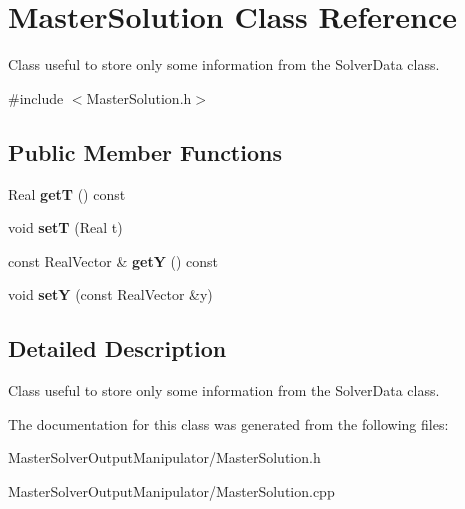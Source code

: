 \hypertarget{classMasterSolution}{
\section{MasterSolution Class Reference}
\label{classMasterSolution}
}


Class useful to store only some information from the SolverData class.  


{\ttfamily \#include $<$MasterSolution.h$>$}\subsection*{Public Member Functions}
\begin{DoxyCompactItemize}
\item 
\hypertarget{classMasterSolution_a5636ad5be535ed1d73f23862b70bf0f8}{
Real {\bfseries getT} () const }
\label{classMasterSolution_a5636ad5be535ed1d73f23862b70bf0f8}

\item 
\hypertarget{classMasterSolution_aab93fbe3e24d67549d22ff7cdf879b84}{
void {\bfseries setT} (Real t)}
\label{classMasterSolution_aab93fbe3e24d67549d22ff7cdf879b84}

\item 
\hypertarget{classMasterSolution_a3c51bf00996eb64b35722b329d86768a}{
const RealVector \& {\bfseries getY} () const }
\label{classMasterSolution_a3c51bf00996eb64b35722b329d86768a}

\item 
\hypertarget{classMasterSolution_a16075bff7c2b04a0f5638ee6c491eb62}{
void {\bfseries setY} (const RealVector \&y)}
\label{classMasterSolution_a16075bff7c2b04a0f5638ee6c491eb62}

\end{DoxyCompactItemize}


\subsection{Detailed Description}
Class useful to store only some information from the SolverData class. 

The documentation for this class was generated from the following files:\begin{DoxyCompactItemize}
\item 
MasterSolverOutputManipulator/MasterSolution.h\item 
MasterSolverOutputManipulator/MasterSolution.cpp\end{DoxyCompactItemize}
